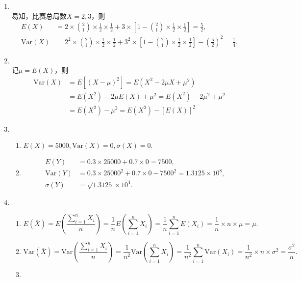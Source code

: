 \begin{enumerate}[label=\arabic{section}.\arabic*]
\begin{enumerate}[label=\alph*)]
    \end{enumerate}
    \item \sol\\
    易知，比赛总局数$X=2,3$，则
    \begin{align*}
        E(X)&=2\times{2 \choose 1}\times\frac{1}{2}\times\frac{1}{2}+3\times\left[1-{2 \choose 1}\times\frac{1}{2}\times\frac{1}{2}\right]=\frac{5}{2},\\
        \mathrm{Var}(X)&=2^2\times{2 \choose 1}\times\frac{1}{2}\times\frac{1}{2}+3^2\times\left[1-{2 \choose 1}\times\frac{1}{2}\times\frac{1}{2}\right]-\left(\frac{5}{2}\right)^2=\frac{1}{4}.
    \end{align*}
    \item \pro\\
    记$\mu = E(X)$，则
    \begin{align*}
        \mathrm{Var}(X)&=E[(X-\mu)^2]=E(X^2-2\mu X+\mu^2)\\
        &=E(X^2)-2\mu E(X)+\mu^2=E(X^2)-2\mu^2+\mu^2\\
        &=E(X^2)-\mu^2=E(X^2)-[E(X)]^2
    \end{align*}
    \item \sol
    \begin{enumerate}[label=\alph*)]
        \item $E(X) = 5000, \mathrm{Var}(X)=0, \sigma(X) = 0$.
        \item
        \begin{align*}
            E(Y)&=0.3\times25000+0.7\times0=7500,\\
            \mathrm{Var}(Y)&=0.3\times25000^2+0.7\times0-7500^2=1.3125\times10^8,\\
            \sigma(Y)&=\sqrt{1.3125}\times10^4.
        \end{align*}
    \end{enumerate}
    \item \pro
    \begin{enumerate}[label=\alph*)]
        \item \[E(\bar{X})=E\left(\frac{\sum\limits_{i=1}^n X_i}{n}\right)=\frac{1}{n}E\left(\sum\limits_{i=1}^n X_i\right)=\frac{1}{n}\sum\limits_{i=1}^n E(X_i)=\frac{1}{n}\times n \times \mu=\mu.\]
        \item \[\mathrm{Var}(\bar{X})=\mathrm{Var}\left(\frac{\sum\limits_{i=1}^n X_i}{n}\right)=\frac{1}{n^2}\mathrm{Var}\left(\sum\limits_{i=1}^n X_i\right)=\frac{1}{n^2}\sum\limits_{i=1}^n \mathrm{Var}(X_i)=\frac{1}{n^2}\times n \times \sigma^2=\frac{\sigma^2}{n}.\]
        \item \begin{align*}

\end{align*}
\end{enumerate}
\end{enumerate}
